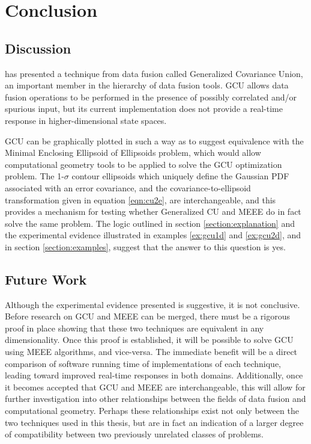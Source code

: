 \chapter{Conclusion}\label{chapter:conclusion}

\section{Discussion}

 has presented a technique from data fusion called Generalized Covariance Union, an important
member in the hierarchy of data fusion tools. GCU allows data fusion operations to be performed in the presence of
possibly correlated and/or spurious input, but its current implementation does not provide a real-time response in
higher-dimensional state spaces.

GCU can be graphically plotted in such a way as to suggest equivalence with the Minimal Enclosing Ellipsoid of
Ellipsoids problem, which would allow computational geometry tools to be applied to solve the GCU optimization problem.
The 1-$\sigma$ contour ellipsoids which uniquely define the Gaussian PDF associated with an error covariance, and the
covariance-to-ellipsoid transformation given in equation \ref{eqn:cu2e}, are interchangeable, and this provides a
mechanism for testing whether Generalized CU and MEEE do in fact solve the same problem. The logic outlined in section
\ref{section:explanation} and the experimental evidence illustrated in examples \ref{ex:gcu1d} and \ref{ex:gcu2d}, and
in section \ref{section:examples}, suggest that the answer to this question is yes.


\section{Future Work}

Although the experimental evidence presented is suggestive, it is not conclusive. Before research on GCU and MEEE can be
merged, there must be a rigorous proof in place showing that these two techniques are equivalent in any dimensionality.
Once this proof is established, it will be possible to solve GCU using MEEE algorithms, and vice-versa. The immediate
benefit will be a direct comparison of software running time of implementations of each technique, leading toward
improved real-time responses in both domains. Additionally, once it becomes accepted that GCU and MEEE are
interchangeable, this will allow for further investigation into other relationships between the fields of data fusion
and computational geometry. Perhaps these relationships exist not only between the two techniques used in this thesis,
but are in fact an indication of a larger degree of compatibility between two previously unrelated classes of problems.

